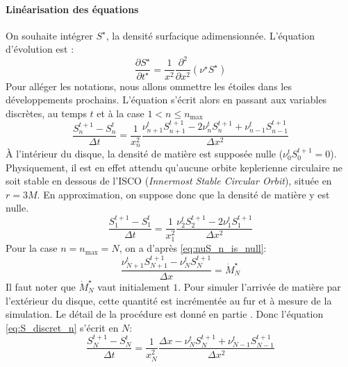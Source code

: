 \paragraph{Linéarisation des équations}

On souhaite intégrer $S^\star$, la densité surfacique adimensionnée. L'équation d'évolution est :
\begin{equation}
  \frac{\partial S^\star}{\partial t^\star} = \frac{1}{x^2}\frac{\partial^2}{\partial x^2}\left(\nu^\star S^\star\right)
\end{equation}
Pour alléger les notations, nous allons ommettre les étoiles dans les développements prochains. L'équation s'écrit alors en passant aux variables discrètes, au temps $t$ et à la case $1<n\leq n_\textrm{max}$
\begin{equation}
  \label{eq:S_discret_n}
  \frac{S^{t+1}_n - S^t_n}{\Delta t} = \frac{1}{x_n^2}\frac{\nu^t_{n+1}S^{t+1}_{n+1} - 2 \nu^t_nS^{t+1}_n + \nu^t_{n-1}S^{t+1}_{n-1}}{\Delta x^2}
\end{equation}
À l'intérieur du disque, la densité de matière est supposée nulle ($\nu^t_{0}S^{t+1}_{0} = 0$). Physiquement, il est en effet attendu qu'aucune orbite keplerienne circulaire ne soit stable en dessous de l'ISCO (\emph{\emph{I}nnermost \emph{S}table \emph{C}ircular \emph{O}rbit}), située en $r = 3M$. En approximation, on suppose donc que la densité de matière y est nulle. 
\begin{equation}
  \label{eq:S_discret_1}
  \frac{S^{t+1}_1 - S^t_1}{\Delta t} = \frac{1}{x_1^2}\frac{\nu^t_{2}S^{t+1}_{2} - 2 \nu^t_1S^{t+1}_1}{\Delta x^2}
\end{equation}
Pour la case $n = n_\textrm{max} = N$, on a d'après \eqref{eq:nuS_n_is_null}:
\begin{equation}
  \frac{\nu^{t}_{N+1}S^{t+1}_{N+1} - \nu^{t}_NS^{t+1}_N}{\Delta x} = \dot{M}^\star_N
\end{equation}
Il faut noter que $\dot{M}^\star_N$ vaut initialement $1$. Pour simuler l'arrivée de matière par l'extérieur du disque, cette quantité est incrémentée au fur et à mesure de la simulation. Le détail de la procédure est donné en partie .
Donc l'équation \eqref{eq:S_discret_n} s'écrit en $N$:
\begin{equation}
  \label{eq:S_discret_N}
  \frac{S^{t+1}_N - S^t_N}{\Delta t} = \frac{1}{x_N^2}\frac{\Delta x - \nu^{t}_NS^{t+1}_N + \nu^{t}_{N-1}S^{t+1}_{N-1}}{\Delta x^2}
\end{equation}

